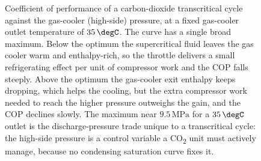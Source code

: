\begin{figure}[htbp]
\centering
{}
\caption[Gas-cooler pressure optimum for a CO\textsubscript{2} transcritical
cycle]{Coefficient of performance of a carbon-dioxide transcritical cycle
against the gas-cooler (high-side) pressure, at a fixed gas-cooler outlet
temperature of $35\,\degC$. The curve has a single broad maximum. Below the
optimum the supercritical fluid leaves the gas cooler warm and
enthalpy-rich, so the throttle delivers a small refrigerating effect per
unit of compressor work and the COP falls steeply. Above the optimum the
gas-cooler exit enthalpy keeps dropping, which helps the cooling, but the
extra compressor work needed to reach the higher pressure outweighs the
gain, and the COP declines slowly. The maximum near $9.5\,\text{MPa}$ for a
$35\,\degC$ outlet is the discharge-pressure trade unique to a transcritical
cycle: the high-side pressure is a control variable a CO\textsubscript{2}
unit must actively manage, because no condensing saturation curve fixes it.}
\label{fig:vol04ch02:co2-gascooler-optimum}
\end{figure}
